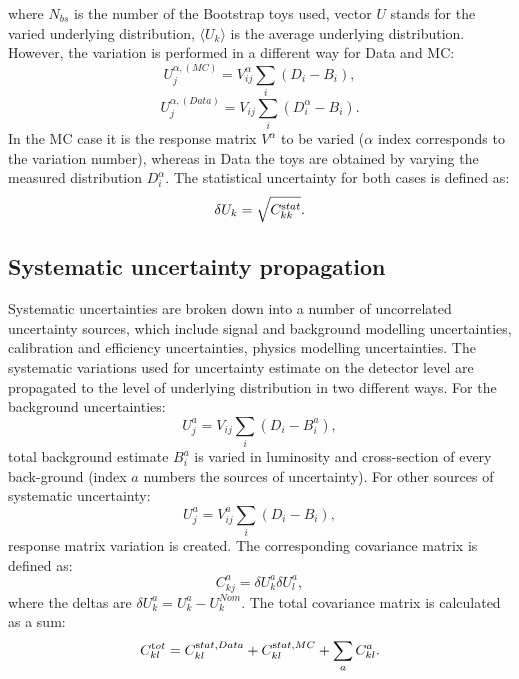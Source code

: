 where $N_{bs}$ is the number of the Bootstrap toys used, vector $U$ stands for the varied underlying distribution, $\langle{U}_k\rangle$ is the average underlying distribution. However, the variation is performed in a different way for Data and MC:
 \begin{equation*}
U_j^{\alpha,(MC)} = V_{ij}^\alpha \sum_{i} (D_i - B_i),
 \end{equation*}
  \begin{equation*}
U_j^{\alpha,(Data)}  = V_{ij} \sum_{i} (D_i^\alpha - B_i).
 \end{equation*}
 In the MC case it is the response matrix $V^\alpha$ to be varied ($\alpha$ index corresponds to the variation number), whereas in Data the toys are obtained by varying the measured distribution $D^\alpha_i$. The statistical uncertainty for both cases is defined as:
 \begin{equation}
 \delta U_k = \sqrt{C_{kk}^{\textrm stat}}.
 \end{equation}
\subsection{Systematic uncertainty propagation}
Systematic uncertainties are broken down into a number of uncorrelated uncertainty sources, which include signal and background modelling uncertainties, calibration and efficiency uncertainties, physics modelling uncertainties. The systematic variations used for uncertainty estimate on the detector level are propagated to the level of underlying distribution in two different ways. For the background uncertainties:
 \begin{equation*}
U_j^{a} = V_{ij}\sum_{i} (D_i - B^a_i),
\end{equation*}
total background estimate $B^a_i$ is varied in luminosity and cross-section of every back-ground (index $a$ numbers the sources of uncertainty). For other sources of systematic uncertainty:
 \begin{equation*}
U_j^{a} = V_{ij}^a \sum_{i} (D_i - B_i),
\end{equation*}
response matrix variation is created. The corresponding covariance matrix is defined as:
 \begin{equation*}
C_{kj}^{a} = \delta U^a_k \delta U^a_l,
\end{equation*}
where the deltas are $\delta U^a_k=U^a_k-U^{Nom}_k$.
The total covariance matrix is calculated as a sum:
\begin{equation}
C_{kl}^{\textrm tot} = C_{kl}^{\textrm stat,Data} + C_{kl}^{\textrm stat,MC} + \sum_a C_{kl}^a.
\end{equation}	
